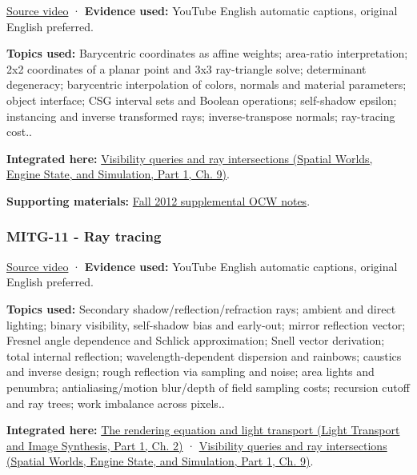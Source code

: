 \hypertarget{04-visual-computing-ii-ch036-mitg-10---ray-casting-ii}{}

\href{https://www.youtube.com/watch?v=gDayCevuE-U}{Source video} · \textbf{Evidence used:} YouTube English automatic captions, original English preferred.

\textbf{Topics used:} Barycentric coordinates as affine weights; area-ratio interpretation; 2x2 coordinates of a planar point and 3x3 ray-triangle solve; determinant degeneracy; barycentric interpolation of colors, normals and material parameters; object interface; CSG interval sets and Boolean operations; self-shadow epsilon; instancing and inverse transformed rays; inverse-transpose normals; ray-tracing cost..

\textbf{Integrated here:} \href{../05-Spatial-Worlds-Engine-State-and-Simulation-P01/main.pdf\#nameddest=04-visual-computing-ii-ch028-visibility-queries-and-ray-intersections-1}{Visibility queries and ray intersections (Spatial Worlds, Engine State, and Simulation, Part 1, Ch. 9)}.

\textbf{Supporting materials:} \href{https://ocw.mit.edu/courses/6-837-computer-graphics-fall-2012/pages/lecture-notes/}{Fall 2012 supplemental OCW notes}.

\subsubsection{MITG-11 - Ray tracing}\label{04-visual-computing-ii-ch036-mitg-11---ray-tracing}

\hypertarget{04-visual-computing-ii-ch036-mitg-11---ray-tracing}{}

\href{https://www.youtube.com/watch?v=UL54Rf2O9RM}{Source video} · \textbf{Evidence used:} YouTube English automatic captions, original English preferred.

\textbf{Topics used:} Secondary shadow/reflection/refraction rays; ambient and direct lighting; binary visibility, self-shadow bias and early-out; mirror reflection vector; Fresnel angle dependence and Schlick approximation; Snell vector derivation; total internal reflection; wavelength-dependent dispersion and rainbows; caustics and inverse design; rough reflection via sampling and noise; area lights and penumbra; antialiasing/motion blur/depth of field sampling costs; recursion cutoff and ray trees; work imbalance across pixels..

\textbf{Integrated here:} \href{../04-Light-Transport-and-Image-Synthesis-P01/main.pdf\#nameddest=03-visual-computing-i-ch007-the-rendering-equation-and-light-transport}{The rendering equation and light transport (Light Transport and Image Synthesis, Part 1, Ch. 2)} · \href{../05-Spatial-Worlds-Engine-State-and-Simulation-P01/main.pdf\#nameddest=04-visual-computing-ii-ch028-visibility-queries-and-ray-intersections-1}{Visibility queries and ray intersections (Spatial Worlds, Engine State, and Simulation, Part 1, Ch. 9)}.

